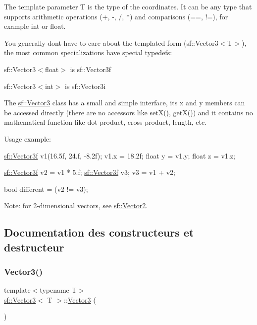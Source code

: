 The template parameter T is the type of the coordinates. It can be any type that supports arithmetic operations (+, -\/, /, $\ast$) and comparisons (==, !=), for example int or float.

You generally don\textquotesingle{}t have to care about the templated form (sf\+::\+Vector3$<$\+T$>$), the most common specializations have special typedefs\+: \begin{DoxyItemize}
\item sf\+::\+Vector3$<$float$>$ is sf\+::\+Vector3f \item sf\+::\+Vector3$<$int$>$ is sf\+::\+Vector3i\end{DoxyItemize}
The \hyperlink{classsf_1_1Vector3}{sf\+::\+Vector3} class has a small and simple interface, its x and y members can be accessed directly (there are no accessors like set\+X(), get\+X()) and it contains no mathematical function like dot product, cross product, length, etc.

Usage example\+: 
\begin{DoxyCode}
\hyperlink{classsf_1_1Vector3}{sf::Vector3f} v1(16.5f, 24.f, -8.2f);
v1.x = 18.2f;
\textcolor{keywordtype}{float} y = v1.y;
\textcolor{keywordtype}{float} z = v1.z;

\hyperlink{classsf_1_1Vector3}{sf::Vector3f} v2 = v1 * 5.f;
\hyperlink{classsf_1_1Vector3}{sf::Vector3f} v3;
v3 = v1 + v2;

\textcolor{keywordtype}{bool} different = (v2 != v3);
\end{DoxyCode}


Note\+: for 2-\/dimensional vectors, see \hyperlink{classsf_1_1Vector2}{sf\+::\+Vector2}. 

\subsection{Documentation des constructeurs et destructeur}
\mbox{\label{classsf_1_1Vector3_aee8be1985c6e45e381ad4071265636f9}} 
\subsubsection{\texorpdfstring{Vector3()}{Vector3()}\hspace{0.1cm}{\footnotesize\ttfamily [1/3]}}
{\footnotesize\ttfamily template$<$typename T$>$ \\
\hyperlink{classsf_1_1Vector3}{sf\+::\+Vector3}$<$ T $>$\+::\hyperlink{classsf_1_1Vector3}{Vector3} (\begin{DoxyParamCaption}{ }\end{DoxyParamCaption})}



